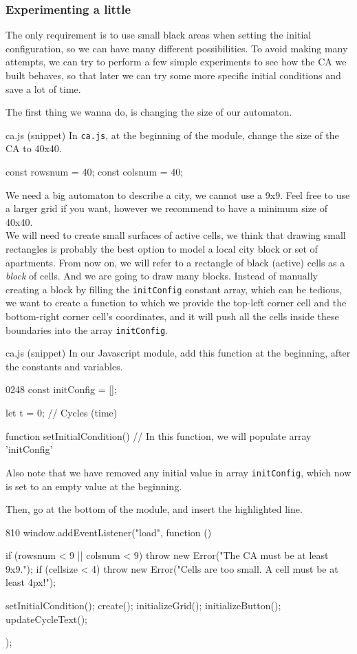 \subsubsection{Experimenting a little}
The only requirement is to use small black areas when setting the initial configuration, so
we can have many different possibilities. To avoid making many attempts, we can try to perform
a few simple experiments to see how the CA we built behaves, so that later we can try some more
specific initial conditions and save a lot of time.

The first thing we wanna do, is changing the size of our automaton.

\begin{programcode}{ca.js (snippet)}
In \texttt{ca.js}, at the beginning of the module, change the size of the CA to 40x40.
\begin{code}
const rowsnum = 40;
const colsnum = 40;
\end{code}
\end{programcode}

We need a big automaton to describe a city, we cannot use a 9x9. Feel free to use a larger grid if
you want, however we recommend to have a minimum size of 40x40.\\

We will need to create small surfaces of active cells, we think that drawing small rectangles
is probably the best option to model a local city block or set of apartments. 
From now on, we will refer to a rectangle of black (active) cells as a \textit{block} of cells.
And we are going to draw many blocks. Instead of manually creating a block by filling the
\texttt{initConfig} constant array, which can be tedious, we want to create a function
to which we provide the top-left corner cell and the bottom-right corner cell's coordinates, and it
will push all the cells inside these boundaries into the array \texttt{initConfig}.

\begin{programcode}{ca.js (snippet)}
In our Javascript module, add this function at the beginning, after the constants and variables.
\begin{codeh2}{0}{2}{4}{8}
const initConfig = [];

let t = 0; // Cycles (time)

function setInitialCondition() {
    // In this function, we will populate array 'initConfig'
}
\end{codeh2}
Also note that we have removed any initial value in array \texttt{initConfig}, which now is set
to an empty value at the beginning.

Then, go at the bottom of the module, and insert the highlighted line.
\begin{codeh1}{8}{10}
window.addEventListener("load", function () {
  if (rowsnum < 9 || colsnum < 9) {
    throw new Error("The CA must be at least 9x9.");
  }
  if (cellsize < 4) {
    throw new Error("Cells are too small. A cell must be at least 4px!");
  }

  setInitialCondition();
  create();
  initializeGrid();
  initializeButton();
  updateCycleText();
});
\end{codeh1}
\end{programcode}

